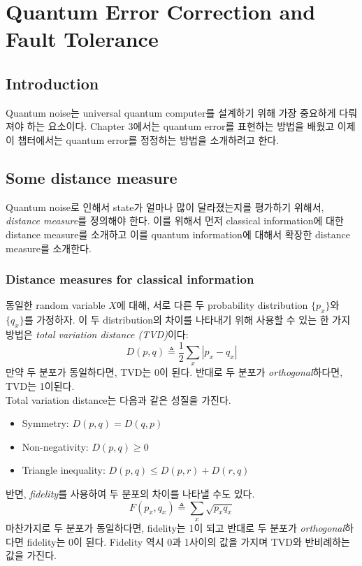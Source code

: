 \chapter{Quantum Error Correction and Fault Tolerance}
\section{Introduction}
Quantum noise는 universal quantum computer를 설계하기 위해 가장 중요하게 다뤄져야 하는 요소이다. Chapter 3에서는 quantum error를 표현하는 방법을 배웠고 이제 이 챕터에서는 quantum error를 정정하는 방법을 소개하려고 한다.

\section{Some distance measure}
Quantum noise로 인해서 state가 얼마나 많이 달라졌는지를 평가하기 위해서, \textit{distance measure}를 정의해야 한다. 이를 위해서 먼저 classical information에 대한 distance measure를 소개하고 이를 quantum information에 대해서 확장한 distance measure를 소개한다.
\subsection{Distance measures for classical information}
동일한 random variable $X$에 대해, 서로 다른 두 probability distribution $\{p_x\}$와 $\{q_x\}$를 가정하자. 이 두 distribution의 차이를 나타내기 위해 사용할 수 있는 한 가지 방법은 \textit{total variation distance (TVD)}이다:
\begin{equation*}
    D(p, q) \triangleq \frac{1}{2} \sum_{x}|p_x-q_x|
\end{equation*}
만약 두 분포가 동일하다면, TVD는 0이 된다. 반대로 두 분포가 \textit{orthogonal}하다면, TVD는 1이된다.\\
Total variation distance는 다음과 같은 성질을 가진다.
\begin{itemize}
    \item Symmetry: $D(p, q)=D(q, p)$
    \item Non-negativity: $D(p, q) \geq 0$
    \item Triangle inequality: $D(p, q) \leq D(p, r)+D(r, q)$
\end{itemize}
\vspace{1em}
반면, \textit{fidelity}를 사용하여 두 분포의 차이를 나타낼 수도 있다.
\begin{equation*}
    F\left(p_x, q_x\right) \triangleq \sum_x \sqrt{p_x q_x} 
\end{equation*}
마찬가지로 두 분포가 동일하다면, fidelity는 1이 되고 반대로 두 분포가 \textit{orthogonal}하다면 fidelity는 0이 된다. Fidelity 역시 0과 1사이의 값을 가지며 TVD와 반비례하는 값을 가진다.

